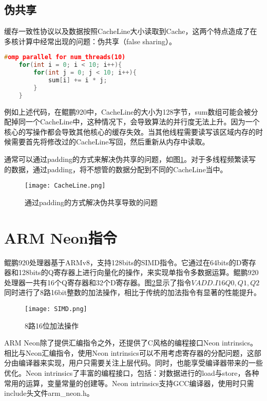 \subsection{伪共享}
缓存一致性协议以及数据按照CacheLine大小读取到Cache，这两个特点造成了在多核计算中经常出现的问题：伪共享（false sharing）。

\begin{lstlisting}[language=c++]
    #omp parallel for num_threads(10)
    for(int i = 0; i < 10; i++){
        for(int j = 0; j < 10; i++){
            sum[i] += i * j;
        }
    }
\end{lstlisting}

例如上述代码，在鲲鹏920中，CacheLine的大小为128字节，sum数组可能会被分配掉同一个CacheLine中，这种情况下，会导致算法的并行度无法上升。因为一个核心的写操作都会导致其他核心的缓存失效。当其他线程需要读写该区域内存的时候需要首先将修改过的CacheLine写回，然后重新从内存中读取。

通常可以通过padding的方式来解决伪共享的问题，如图\ref{通过padding的方式解决伪共享导致的问题}。对于多线程频繁读写的数据，通过padding，将不想管的数据分配到不同的CacheLine当中。

\begin{figure}[htbp]
    \centering
    \texttt{[image: CacheLine.png]}
    \caption{通过padding的方式解决伪共享导致的问题}
    \label{通过padding的方式解决伪共享导致的问题}
\end{figure}

\section{ARM Neon指令}

鲲鹏920处理器基于ARMv8，支持128bits的SIMD指令。它通过在64bits的D寄存器和128bits的Q寄存器上进行向量化的操作，来实现单指令多数据运算。鲲鹏920处理器一共有16个Q寄存器和32个D寄存器。图\ref{SIMD}显示了指令$VADD.I16 Q0, Q1, Q2$同时进行了8路16bit整数的加法操作，相比于传统的加法指令有显著的性能提升。
\begin{figure}[htbp]
    \centering
    \texttt{[image: SIMD.png]}
    \caption{8路16位加法操作}
    \label{SIMD}
\end{figure}
ARM Neon除了提供汇编指令之外，还提供了C风格的编程接口Neon intrinsics。相比与Neon汇编指令，使用Neon intrinsics可以不用考虑寄存器的分配问题，这部分由编译器来实现，用户只需要关注上层代码。同时，也能享受编译器带来的一些优化。Neon intrinsics了丰富的编程接口，包括：对数据进行的load与store，各种常用的运算，变量常量的创建等。Neon intrinsics支持GCC编译器，使用时只需include头文件arm\_neon.h。


